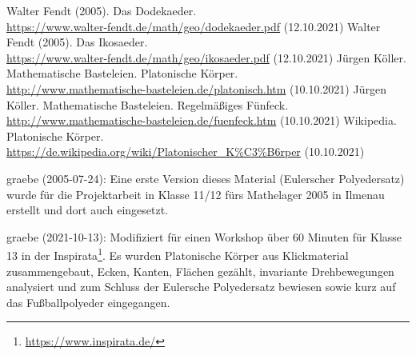 \documentclass[11pt]{article}
\begin{document}
\begin{thebibliography}{xxx}
 Walter Fendt (2005). Das Dodekaeder.\\
  \url{https://www.walter-fendt.de/math/geo/dodekaeder.pdf} (12.10.2021) 
 Walter Fendt (2005). Das Ikosaeder.\\
  \url{https://www.walter-fendt.de/math/geo/ikosaeder.pdf} (12.10.2021) 
 Jürgen Köller. Mathematische Basteleien.
  Platonische Körper.\\
  \url{http://www.mathematische-basteleien.de/platonisch.htm} (10.10.2021)
 Jürgen Köller. Mathematische Basteleien.
  Regelmäßiges Fünfeck.\\
  \url{http://www.mathematische-basteleien.de/fuenfeck.htm} (10.10.2021)
 Wikipedia. Platonische Körper.\\ 
  \url{https://de.wikipedia.org/wiki/Platonischer_K%C3%B6rper} (10.10.2021)
\end{thebibliography}

\begin{attribution}
graebe (2005-07-24): Eine erste Version dieses Material (Eulerscher
Polyedersatz) wurde für die Projektarbeit in Klasse 11/12 fürs Mathelager 2005
in Ilmenau erstellt und dort auch eingesetzt.

graebe (2021-10-13): Modifiziert für einen Workshop über 60 Minuten für Klasse
13 in der Inspirata\footnote{\url{https://www.inspirata.de/}}.  Es wurden
Platonische Körper aus Klickmaterial zusammengebaut, Ecken, Kanten, Flächen
gezählt, invariante Drehbewegungen analysiert und zum Schluss der Eulersche
Polyedersatz bewiesen sowie kurz auf das Fußballpolyeder eingegangen.

\end{attribution}
\end{document}
